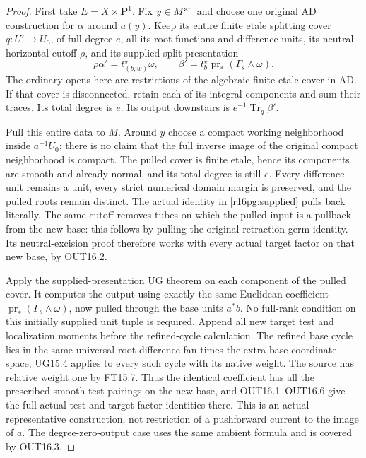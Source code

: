 \begin{proof}
First take $E=X\times\mathbf P^1$. Fix $y\in M^{\rm an}$ and
choose one original AD construction for $\alpha$ around $a(y)$.
Keep its entire finite etale splitting cover
$q:U'\to U_0$, of full degree $e$, all its root functions and
difference units, its neutral horizontal cutoff $\rho$, and its
supplied split presentation
\[
 \rho\alpha'=t_{(b,w)}^\star\omega,
 \qquad
 \beta'=t_b^\star\operatorname{pr}_*(\Gamma_s\wedge\omega).
 \tag{PG16.2}\label{r16pg:supplied}
\]
The ordinary opens here are restrictions of the algebraic finite
etale cover in AD. If that cover is disconnected, retain each of
its integral components and sum their traces. Its total degree
is $e$. Its output downstairs is $e^{-1}\operatorname{Tr}_q\beta'$.

Pull this entire data to $M$. Around $y$ choose a compact working
neighborhood inside $a^{-1}U_0$; there is no claim that the full
inverse image of the original compact neighborhood is compact.
The pulled cover is finite etale, hence its components are smooth
and already normal, and its total degree is still $e$.
Every difference unit remains a unit, every strict numerical
domain margin is preserved, and the pulled roots remain distinct.
The actual identity in \eqref{r16pg:supplied} pulls back literally.
The same cutoff removes tubes on which the pulled input is a
pullback from the new base: this follows by pulling the original
retraction-germ identity. Its neutral-excision proof therefore
works with every actual target factor on that new base, by OUT16.2.

Apply the supplied-presentation UG theorem on each component of
the pulled cover. It computes the output using exactly the same
Euclidean coefficient $\operatorname{pr}_*(\Gamma_s\wedge\omega)$,
now pulled through the base units $a^*b$. No full-rank condition
on this initially supplied unit tuple is required. Append all
new target test and localization moments before the refined-cycle
calculation. The refined base cycle lies in the same universal
root-difference fan times the extra base-coordinate space; UG15.4
applies to every such cycle with its native weight. The source
has relative weight one by FT15.7. Thus the identical coefficient
has all the prescribed smooth-test pairings on the new base, and
OUT16.1--OUT16.6 give the full actual-test and target-factor
identities there. This is an actual representative construction,
not restriction of a pushforward current to the image of $a$.
The degree-zero-output case uses the same ambient formula and
is covered by OUT16.3.


\end{proof}
